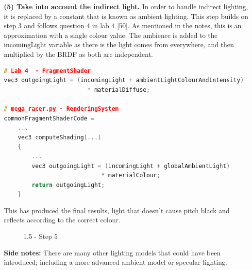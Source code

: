 \documentclass[a4 paper, 12pt]{article}
\begin{document}
\textbf{(5) Take into account the indirect light.}
In order to handle indirect lighting, it is replaced by a constant that is known as ambient lighting. This step builds on step 3 and follows question 4 in lab 4 [50]. As mentioned in the notes, this is an approximation with a single colour value. The ambience is added to the incomingLight variable as there is the light comes from everywhere, and then multiplied by the BRDF as both are independent.
    \begin{lstlisting}[language=c++] 
# Lab 4  - FragmentShader
vec3 outgoingLight = (incomingLight + ambientLightColourAndIntensity) 
                        * materialDiffuse;

# mega_racer.py - RenderingSystem
commonFragmentShaderCode =
    ...
    vec3 computeShading(...)
    {
        ...
        vec3 outgoingLight = (incomingLight + globalAmbientLight) 
                            * materialColour;
        return outgoingLight;
    }       
    \end{lstlisting}

This has produced the final results, light that doesn't cause pitch black and reflects according to the correct colour.
    \begin{figure} [H]
        
        \caption{1.5 - Step 5}   
    \end{figure}

\textbf{Side notes:} There are many other lighting models that could have been introduced; including a more advanced ambient model or specular lighting. 
\end{document}

